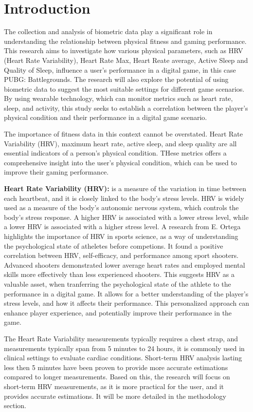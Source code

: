 \chapter{Introduction}

\par

The collection and analysis of biometric data play a significant role in understanding the relationship between physical fitness and gaming performance. This research aims to investigate
how various physical parameters, such as HRV (Heart Rate Variability), Heart Rate Max, Heart Reate average, Active Sleep and Quality of Sleep, influence a user's performance in a digital game, in this case
PUBG: Battlegrounds. The research will also explore the potential of using biometric data to suggest the most suitable settings for different game scenarios. By using wearable technology, which can monitor metrics such as
heart rate, sleep, and activity, this study seeks to establish a correlation between the player's physical condition and their performance in a digital game scenario. 

The importance of fitness data in this context cannot be overstated. Heart Rate Variability (HRV), maximum heart rate, active sleep, and sleep quality are all essential indicators of a person's physical condition.
THese metrics offers a comprehensive insight into the user's physical condition, which can be used to improve their gaming performance. 

\textbf{Heart Rate Variability (HRV):} is a measure of the variation in time between each heartbeat, and it is closely linked to the body's stress levels. HRV is widely used as a measure
of the body's autonomic nervous system, which controls the body's stress response. A higher HRV is associated with a lower stress level, while a lower HRV is associated with a higher stress level. 
A research from E. Ortega\cite{ortega2018pre} highlights the importance of HRV in sports science, as a way of understanding the psychological state of atheletes before competions. It found
a positive correlation between HRV, self-efficacy, and performance among sport shooters. Advanced shooters demonstrated lower average heart rates and employed mental skills more effectively than less experienced shooters.
This suggests HRV as a valuable asset, when tranferring the psychological state of the athlete to the performance in a digital game. It allows for a better understanding of the player's stress levels, and how it affects their performance.
This personalized approach can enhance player experience, and potentially improve their performance in the game. 
\par
The Heart Rate Variability measurements typically requires a chest strap, and measurements typically span from 5 minutes to 24 hours, it is commonly used in clinical settings to evaluate 
cardiac conditions.\cite{malik1996heart} Short-term HRV analysis lasting less then 5 minutes have been proven to provide more accurate estimations compared to longer measurements.\cite{mcnames2006reliability}
Based on this, the research will focus on short-term HRV measurements, as it is more practical for the user, and it provides accurate estimations. It will be more detailed in the methodology section.

